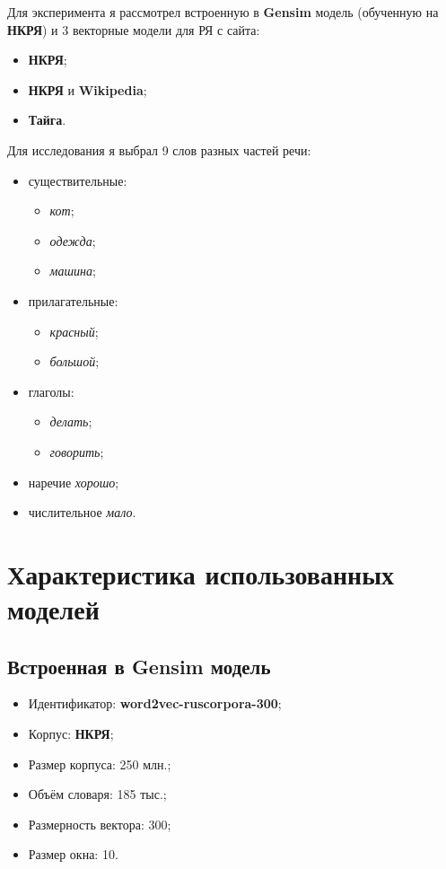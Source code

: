 \documentclass[oneside,final,12pt]{article}
\begin{document}
Для эксперимента я рассмотрел встроенную в \textbf{Gensim} модель (обученную на \textbf{НКРЯ}) и 3 векторные модели для РЯ с сайта:

\begin{itemize}
	\item \textbf{НКРЯ};
	\item \textbf{НКРЯ} и \textbf{Wikipedia};
	\item \textbf{Тайга}.
\end{itemize}

Для исследования я выбрал 9 слов разных частей речи:

\begin{multicols}{2}
	\begin{itemize}
		\item {существительные:
			\begin{itemize}
				\item \textit{кот};
				\item \textit{одежда};
				\item \textit{машина};
			\end{itemize}}
		\item {прилагательные:
			\begin{itemize}
				\item \textit{красный};
				\item \textit{большой};
			\end{itemize}}
		\vfill\null
		\columnbreak
		\item {глаголы:
			\begin{itemize}
				\item \textit{делать};
				\item \textit{говорить};
			\end{itemize}}
		\item наречие \textit{хорошо};
		\item числительное \textit{мало}.
		\vfill\null
	\end{itemize}
\end{multicols}
\clearpage

\section{Характеристика использованных моделей}

\subsection{Встроенная в Gensim модель}

\begin{itemize}
	\item Идентификатор: \textbf{word2vec-ruscorpora-300};
	\item Корпус: \textbf{НКРЯ};
	\item Размер корпуса: 250 млн.;
	\item Объём словаря: 185 тыс.;
	\item Размерность вектора: 300;
	\item Размер окна: 10.
\end{itemize}
\end{document}
